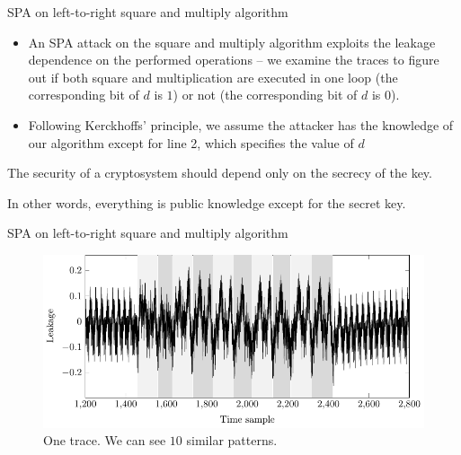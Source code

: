 \begin{frame}{SPA on left-to-right square and multiply algorithm}
\begin{itemize}
    \item An SPA attack on the square and multiply algorithm exploits the leakage dependence on the performed operations -- we examine the traces to figure out if both square and multiplication are executed in one loop (the corresponding bit of $d$ is $1$) or not (the corresponding bit of $d$ is $0$).
    \item Following Kerckhoffs' principle, we assume the attacker has the knowledge of our algorithm except for line 2, which specifies the value of $d$
\end{itemize}
\begin{definition}
The security of a cryptosystem should depend only on the secrecy of the key.
\end{definition}
\noindent
In other words, everything is public knowledge except for the secret key.
\end{frame}

\begin{frame}{SPA on left-to-right square and multiply algorithm}
\begin{figure}[H]
    \centering
    \includegraphics{fig/SPA_RSA_patterns.pdf}
    \caption{One trace.
    We can see $10$ similar patterns.}
\end{figure}
\end{frame}


